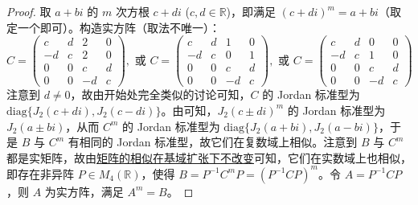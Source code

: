 \documentclass[../../main.tex]{subfiles}
\begin{document}
\begin{proof}
取 $a + bi$ 的 $m$ 次方根 $c + di$ ($c,d\in\mathbb{R}$)，即满足 $(c + di)^m = a + bi$（取定一个即可）。构造实方阵（取法不唯一）：
\[
C = 
\begin{pmatrix}
c & d & 2 & 0 \\
-d & c & 2 & 0 \\
0 & 0 & c & d \\
0 & 0 & -d & c
\end{pmatrix}, \text{ 或 }
C = 
\begin{pmatrix}
c & d & 1 & 0 \\
-d & c & 0 & 1 \\
0 & 0 & c & d \\
0 & 0 & -d & c
\end{pmatrix}, \text{ 或 }
C = 
\begin{pmatrix}
c & d & 0 & 0 \\
-d & c & 1 & 0 \\
0 & 0 & c & d \\
0 & 0 & -d & c
\end{pmatrix}
\]
注意到 $d\neq 0$，故由开始处完全类似的讨论可知，$C$ 的 Jordan 标准型为 $\mathrm{diag}\{J_2(c + di),J_2(c - di)\}$。由可知，$J_2(c\pm di)^m$ 的 Jordan 标准型为 $J_2(a\pm bi)$，从而 $C^m$ 的 Jordan 标准型为 $\mathrm{diag}\{J_2(a + bi),J_2(a - bi)\}$，于是 $B$ 与 $C^m$ 有相同的 Jordan 标准型，故它们在复数域上相似。注意到 $B$ 与 $C^m$ 都是实矩阵，故由\hyperref[corollary:矩阵的相似关系在基域扩张下不变]{矩阵的相似在基域扩张下不改变}可知，它们在实数域上也相似，即存在非异阵 $P\in M_4(\mathbb{R})$，使得 $B = P^{-1}C^mP = (P^{-1}CP)^m$。令 $A = P^{-1}CP$，则 $A$ 为实方阵，满足 $A^m = B$。
\end{proof}
\end{document}
